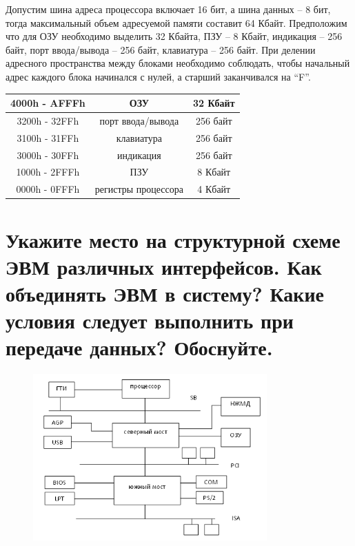 \documentclass[unicode, 12pt, a4paper, oneside]{article}
\begin{document}
Допустим шина адреса процессора включает 16 бит, а шина данных – 8 бит, тогда максимальный объем адресуемой памяти составит 64 Кбайт. Предположим что для ОЗУ необходимо выделить 32 Кбайта, ПЗУ – 8 Кбайт, индикация – 256 байт, порт ввода/вывода – 256 байт, клавиатура – 256 байт. При делении адресного пространства между блоками необходимо соблюдать, чтобы начальный адрес каждого блока начинался с нулей, а старший заканчивался на “F”.

\begin{center}
\begin{tabular}{|c|c|c|}
\hline 4000h - AFFFh & ОЗУ                 &  32 Кбайт  \\
\hline 3200h - 32FFh & порт ввода/вывода   &  256 байт  \\
\hline 3100h - 31FFh & клавиатура          & 256 байт   \\
\hline 3000h - 30FFh & индикация           & 256 байт   \\
\hline 1000h - 2FFFh & ПЗУ                 &  8 Кбайт   \\
\hline 0000h - 0FFFh & регистры процессора & 4 Кбайт    \\
\hline
\end{tabular}
\end{center} 

\section{Укажите место на структурной схеме ЭВМ различных интерфейсов. Как объединять ЭВМ в  систему? Какие условия следует выполнить при  передаче данных? Обоснуйте.}

\begin{figure}[H]
\centering
\includegraphics[width=0.8\textwidth]{./images/102_interface.png}
\end{figure}
\end{document}
